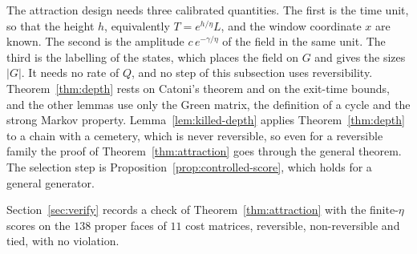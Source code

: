 \begin{remark}\label{rem:design}
The attraction design needs three calibrated quantities. The first is the time
unit, so that the height $h$, equivalently $T=e^{h/\eta}L$, and the window
coordinate $x$ are known. The second is the amplitude $c\,e^{-\gamma/\eta}$ of
the field in the same unit. The third is the labelling of the states, which
places the field on $G$ and gives the sizes $|G|$. It needs no rate of $Q$, and
no step of this subsection uses reversibility. Theorem~\ref{thm:depth} rests on
Catoni's theorem and on the exit-time bounds, and the other lemmas use only the
Green matrix, the definition of a cycle and the strong Markov property.
Lemma~\ref{lem:killed-depth} applies Theorem~\ref{thm:depth} to a chain with a
cemetery, which is never reversible, so even for a reversible family the proof
of Theorem~\ref{thm:attraction} goes through the general theorem. The
selection step is Proposition~\ref{prop:controlled-score}, which holds for a
general generator.
\end{remark}

Section~\ref{sec:verify} records a check of Theorem~\ref{thm:attraction} with the
finite-$\eta$ scores on the $138$ proper faces of $11$ cost matrices,
reversible, non-reversible and tied, with no violation.
